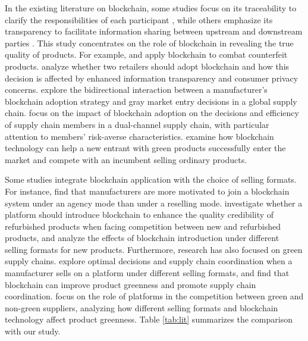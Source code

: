\documentclass[preprint,review,12pt,authoryear,nopreprintline]{elsarticle}
\theoremstyle{definition}
\begin{document}
In the existing literature on blockchain, some studies focus on its traceability to clarify the responsibilities of each participant \citep{Iyengar2024,cui2023value,dong2023impact}, while others emphasize its transparency to facilitate information sharing between upstream and downstream parties \citep{cui2024supply,Keskin2025the}. This study concentrates on the role of blockchain in revealing the true quality of products. For example, \citet{pun2021blockchain} and \citet{shen2022combat} apply blockchain to combat counterfeit products. \citet{zhang2022price} analyze whether two retailers should adopt blockchain and how this decision is affected by enhanced information transparency and consumer privacy concerns. \citet{zhang2023blockchain} explore the bidirectional interaction between a manufacturer's blockchain adoption strategy and gray market entry decisions in a global supply chain. \citet{zhang2023the} focus on the impact of blockchain adoption on the decisions and efficiency of supply chain members in a dual-channel supply chain, with particular attention to members' risk-averse characteristics. \citet{wu2024blockchain} examine how blockchain technology can help a new entrant with green products successfully enter the market and compete with an incumbent selling ordinary products.

Some studies integrate blockchain application with the choice of selling formats. For instance, \citet{zhao2024sales} find that manufacturers are more motivated to join a blockchain system under an agency mode than under a reselling mode. \citet{chen2025platform} investigate whether a platform should introduce blockchain to enhance the quality credibility of refurbished products when facing competition between new and refurbished products, and analyze the effects of blockchain introduction under different selling formats for new products. Furthermore, research has also focused on green supply chains. \citet{xu2023coor} explore optimal decisions and supply chain coordination when a manufacturer sells on a platform under different selling formats, and find that blockchain can improve product greenness and promote supply chain coordination. \citet{wu2025platform} focus on the role of platforms in the competition between green and non-green suppliers, analyzing how different selling formats and blockchain technology affect product greenness. Table \ref{tab:lit} summarizes the comparison with our study.
\end{document}
